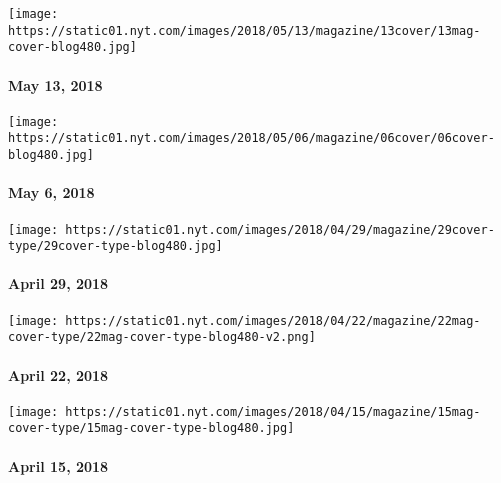 \href{https://www.nytimes.com/issue/magazine/2018/05/25/51318-issue}{}

\texttt{[image: https://static01.nyt.com/images/2018/05/13/magazine/13cover/13mag-cover-blog480.jpg]}

\hypertarget{may-13-2018}{%
\paragraph{May 13, 2018}\label{may-13-2018}}

\href{https://www.nytimes.com/issue/magazine/2018/05/11/5618-issue}{}

\texttt{[image: https://static01.nyt.com/images/2018/05/06/magazine/06cover/06cover-blog480.jpg]}

\hypertarget{may-6-2018}{%
\paragraph{May 6, 2018}\label{may-6-2018}}

\href{https://www.nytimes.com/issue/magazine/2018/05/04/42918-issue}{}

\texttt{[image: https://static01.nyt.com/images/2018/04/29/magazine/29cover-type/29cover-type-blog480.jpg]}

\hypertarget{april-29-2018}{%
\paragraph{April 29, 2018}\label{april-29-2018}}

\href{https://www.nytimes.com/issue/magazine/2018/05/04/42218-issue}{}

\texttt{[image: https://static01.nyt.com/images/2018/04/22/magazine/22mag-cover-type/22mag-cover-type-blog480-v2.png]}

\hypertarget{april-22-2018}{%
\paragraph{April 22, 2018}\label{april-22-2018}}

\href{https://www.nytimes.com/issue/magazine/2018/04/12/41518-issue}{}

\texttt{[image: https://static01.nyt.com/images/2018/04/15/magazine/15mag-cover-type/15mag-cover-type-blog480.jpg]}

\hypertarget{april-15-2018}{%
\paragraph{April 15, 2018}\label{april-15-2018}}

